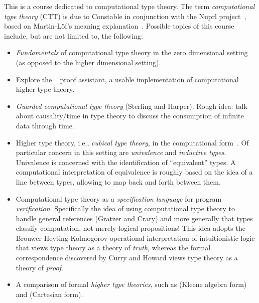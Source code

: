 \documentclass{article}
\begin{document}
This is a course dedicated to computational type theory.  The term \emph{computational type
  theory} (CTT) is due to Constable in conjunction with the
Nuprl project~\citep{Constable:86}, based on Martin-L\"{o}f's meaning
explanation~\citep{MartinLof:79}.  Possible topics of this course
include, but are not limited to, the following:
\begin{itemize}
\item \emph{Fundamentals} of computational type theory in the zero
  dimensional setting (as opposed to the higher dimensional setting).
\item Explore the \redprl{}~\citep{redprl} proof assistant, a usable
  implementation of computational higher type theory.
\item \emph{Guarded computational type theory} (Sterling and Harper). Rough
  idea: talk about causality/time in type theory to discuss the
  consumption of infinite data through time.
\item Higher type theory, i.e., \emph{cubical type theory}, in the computational
  form~\citep{Angiuli:chtt1:16,Angiuli:chtt2:16,Angiuli:chtt3:17,Cavallo:18}.  Of particular
  concern in this setting are \emph{univalence} and \emph{inductive types}.  Univalence is
  concerned with the identification of ``equivalent'' types.  A computational interpretation of
  equivalence is roughly based on the idea of a line between types, allowing to map back and forth
  between them.
\item Computational type theory as a \emph{specification language} for program
  \emph{verification}. Specifically the idea of using computational type theory to handle general
  references (Gratzer and Crary) and more generally that types
  classify computation, not merely logical propositions!  This idea adopts the
  Brouwer-Heyting-Kolmogorov operational interpretation of intuitionistic logic that views type
  theory as a theory of \emph{truth}, whereas the formal correspondence discovered by Curry and
  Howard views type theory as a theory of \emph{proof}.
\item A comparison of formal \emph{higher type theories}, such as
  \citet{Cohen:16} (Kleene algebra form) and \citet{Angiuli:cart:17} (Cartesian form).
\end{itemize}
\end{document}
